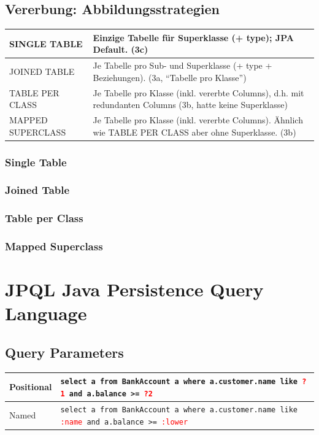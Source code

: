\documentclass[a4paper, landscape, 8pt]{scrartcl}
\begin{document}
\begin{multicols*}{4}
        \subsection{Vererbung: Abbildungsstrategien}
        \begin{tabularx}{\columnwidth}{l | X}
            SINGLE TABLE & Einzige Tabelle für Superklasse (+ type); JPA Default. (3c) \\
            \hline
            JOINED TABLE & Je Tabelle pro Sub- und Superklasse (+ type + Beziehungen). (3a, \enquote{Tabelle pro Klasse}) \\
            \hline
            TABLE PER CLASS & Je Tabelle pro Klasse (inkl. vererbte Columns), d.h. mit redundanten Columns (3b, hatte keine Superklasse) \\
            \hline
            MAPPED SUPERCLASS & Je Tabelle pro Klasse (inkl. vererbte Columns). Ähnlich wie TABLE PER CLASS aber ohne Superklasse. (3b)
        \end{tabularx}

        \subsubsection{Single Table}

        \subsubsection{Joined Table}
        \subsubsection{Table per Class}
        \subsubsection{Mapped Superclass}

        \section{JPQL \tiny{Java Persistence Query Language}}
        \subsection{Query Parameters}
        \begin{tabularx}{\columnwidth}{l | X}
            Positional & \texttt{select a from BankAccount a where a.customer.name like \textcolor{red}{?1} and a.balance >= \textcolor{red}{?2}} \\
            \hline
            Named & \texttt{select a from BankAccount a where a.customer.name like \textcolor{red}{:name} and a.balance >= \textcolor{red}{:lower}}
        \end{tabularx}


\end{multicols*}
\end{document}
